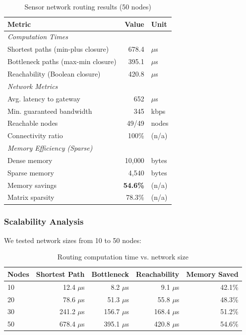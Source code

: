 \documentclass[11pt,a4paper]{article}
\theoremstyle{plain}
\theoremstyle{definition}
\begin{document}
\begin{table}[htbp]
\centering
\caption{Sensor network routing results (50 nodes)}
\label{tab:network-results}
\begin{tabular}{lrl}
\toprule
\textbf{Metric} & \textbf{Value} & \textbf{Unit} \\
\midrule
\multicolumn{3}{l}{\textit{Computation Times}} \\
\quad Shortest paths (min-plus closure) & 678.4 & $\mu$s \\
\quad Bottleneck paths (max-min closure) & 395.1 & $\mu$s \\
\quad Reachability (Boolean closure) & 420.8 & $\mu$s \\
\midrule
\multicolumn{3}{l}{\textit{Network Metrics}} \\
\quad Avg. latency to gateway & 652 & $\mu$s \\
\quad Min. guaranteed bandwidth & 345 & kbps \\
\quad Reachable nodes & 49/49 & nodes \\
\quad Connectivity ratio & 100\% & (n/a) \\
\midrule
\multicolumn{3}{l}{\textit{Memory Efficiency (Sparse)}} \\
\quad Dense memory & 10,000 & bytes \\
\quad Sparse memory & 4,540 & bytes \\
\quad Memory savings & \textbf{54.6\%} & (n/a) \\
\quad Matrix sparsity & 78.3\% & (n/a) \\
\bottomrule
\end{tabular}
\end{table}

\subsubsection{Scalability Analysis}

We tested network sizes from 10 to 50 nodes:

\begin{table}[htbp]
\centering
\caption{Routing computation time vs. network size}
\label{tab:network-scaling}
\begin{tabular}{lrrrr}
\toprule
\textbf{Nodes} & \textbf{Shortest Path} & \textbf{Bottleneck} & \textbf{Reachability} & \textbf{Memory Saved} \\
\midrule
10 & 12.4 $\mu$s & 8.2 $\mu$s & 9.1 $\mu$s & 42.1\% \\
20 & 78.6 $\mu$s & 51.3 $\mu$s & 55.8 $\mu$s & 48.3\% \\
30 & 241.2 $\mu$s & 156.7 $\mu$s & 168.4 $\mu$s & 51.2\% \\
50 & 678.4 $\mu$s & 395.1 $\mu$s & 420.8 $\mu$s & 54.6\% \\
\bottomrule
\end{tabular}
\end{table}
\end{document}
